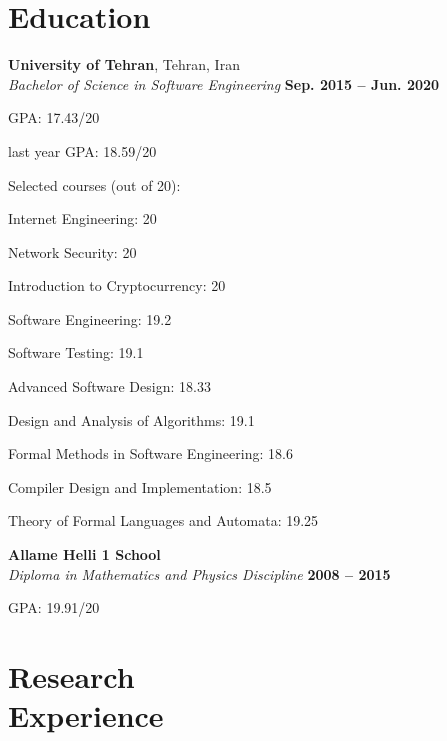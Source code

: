 \documentclass[line, mm]{sampleCV}
\begin{document}
\begin{resume}
\section{\mysidestyle Education}
    \textbf{University of Tehran}, Tehran, Iran \vspace{2mm}\\\vspace{1mm}
    \textsl{Bachelor of Science in Software Engineering} \hfill \textbf{ Sep. 2015 -- Jun. 2020}\vspace{-3mm}\\\vspace{-1mm}%
    \begin{list2}
        \item GPA: 17.43/20
       	\item last year GPA: 18.59/20
		\item Selected courses (out of 20): 
		\begin{list2}
		\item Internet Engineering: 20			
		\item Network Security: 20
		\item Introduction to Cryptocurrency: 20
		\item Software Engineering: 19.2
		\item Software Testing: 19.1
		\item Advanced Software Design: 18.33
		\item Design and Analysis of Algorithms: 19.1    
		\item Formal Methods in Software Engineering: 18.6
		\item Compiler Design and Implementation: 18.5
		\item Theory of Formal Languages and Automata: 19.25
		\end{list2}
    \end{list2}\vspace{-1.5mm}


\textbf{Allame Helli 1 School} \\
\textsl{Diploma in Mathematics and Physics Discipline} \hfill \textbf{ 2008 -- 2015}%
 \begin{list2}
	\item GPA: 19.91/20 \
	\end{list2}
	
	
	\section{\mysidestyle Research\\Experience} 
	

\end{resume}
\end{document}
